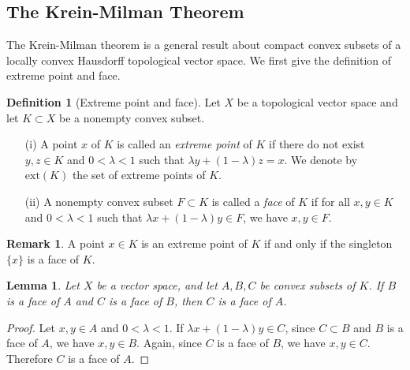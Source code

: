 \documentclass{article}
\numberwithin{equation}{section}
\theoremstyle{plain}
\newtheorem{lemma}[theorem]{Lemma}
\theoremstyle{definition}
\newtheorem{definition}[theorem]{Definition}
\newtheorem*{remark}{Remark}
\begin{document}
\newpage
\subsection{The Krein-Milman Theorem}
The Krein-Milman theorem is a general result about compact
convex subsets of a locally convex Hausdorff topological vector space. We first give the definition of extreme point and face.
\begin{definition}[Extreme point and face]
Let $X$ be a topological vector space and let $K\subset X$ be a nonempty convex subset. 
\begin{itemize}
	\item[(i)] A point $x$ of $K$ is called an \textit{extreme point} of $K$ if there do not exist $y,z\in K$ and $0<\lambda<1$ such that $\lambda y+(1-\lambda)z=x$. We denote by $\mathrm{ext}(K)$ the set of extreme points of $K$.
	\item[(ii)] A nonempty convex subset $F\subset K$ is called a \textit{face} of $K$ if for all $x,y\in K$ and $0<\lambda<1$ such that $\lambda x+(1-\lambda)y\in F$, we have $x,y\in F$.
\end{itemize} 
\begin{remark}
A point $x\in K$ is an extreme point of $K$ if and only if the singleton $\{x\}$ is a face of $K$.
\end{remark}
\end{definition}

\begin{lemma}\label{kmlemma1}
Let $X$ be a vector space, and let $A,B,C$ be convex subsets of $K$. If $B$ is a face of $A$ and $C$ is a face of $B$, then $C$ is a face of $A$.
\end{lemma}
\begin{proof}
Let $x,y\in A$ and $0<\lambda<1$. If $\lambda x+(1-\lambda)y\in C$, since $C\subset B$ and $B$ is a face of $A$, we have $x,y\in B$. Again, since $C$ is a face of $B$, we have $x,y\in C$. Therefore $C$ is a face of $A$.
\end{proof}
\end{document}
